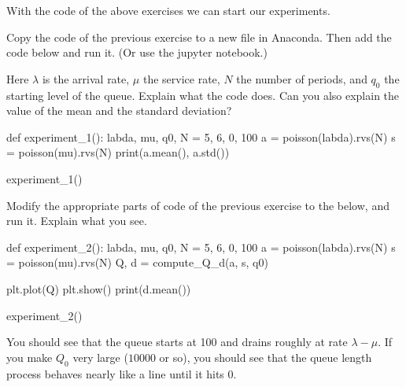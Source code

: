 With the code of the above exercises we can start our experiments.

\begin{exercise}\label{ex:4}
  Copy the code of the previous exercise to a new file in Anaconda.
  Then add the code below and run it. (Or use the jupyter notebook.)

  Here $\lambda$ is the arrival rate, $\mu$ the service rate, $N$ the number of periods, and $q_0$ the starting level of the queue.
  Explain what the code does.
  Can you also explain the value of the mean and the standard deviation?

\begin{pyverbatim}
def experiment_1():
    labda, mu, q0, N = 5, 6, 0, 100
    a = poisson(labda).rvs(N)
    s = poisson(mu).rvs(N)
    print(a.mean(), a.std())

experiment_1()
\end{pyverbatim}

\end{exercise}

\begin{exercise}
  Modify  the appropriate parts of  code of the previous exercise to the below,  and run it. Explain what you see.

\begin{pyverbatim}
def experiment_2():
    labda, mu, q0, N = 5, 6, 0, 100
    a = poisson(labda).rvs(N)
    s = poisson(mu).rvs(N)
    Q, d = compute_Q_d(a, s, q0)

    plt.plot(Q)
    plt.show()
    print(d.mean())


experiment_2()
\end{pyverbatim}

\begin{solution}
  You should see that the queue starts at 100 and drains roughly at rate $\lambda-\mu$.
  If you make $Q_0$ very large ($10 000$ or so), you should see that the queue length process behaves nearly like a line until it hits 0.
\end{solution}
\end{exercise}


